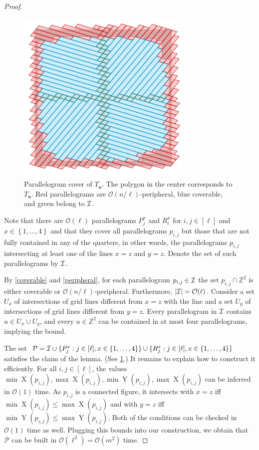 \documentclass[twoside,leqno]{article}
\newcommand{\Z}{\mathbb{Z}}
\renewcommand{\O}{\mathcal{O}}
\newcommand{\Ta}{T_\mathbf{a}}
\newcommand{\set}[1]{\left\lbrace #1 \right\rbrace}
\DeclareMathOperator*{\X}{X}
\DeclareMathOperator*{\Y}{Y}
\newcommand{\absolute}[1]{\left\lvert#1\right\rvert}
\begin{document}
\begin{proof}
\begin{figure}
        \centering
        \includegraphics[width=0.75\textwidth]{drawings/text_decomposition}
        \caption{Parallelogram cover of $\Ta$. The polygon in the center corresponds to $\Ta$. Red parallelograms are $\O(n/\ell)$-peripheral, blue coverable, and green belong to $\mathcal{I}$.}
        \label{figure:text_decomposition}
\end{figure}

Note that there are $\O(\ell)$ parallelograms $P_j^x$ and $R_i^x$ for $i,j \in [\ell]$ and $x \in \set{1, \dots, 4}$ and that they cover all parallelograms $p_{i,j}$ but those that are not fully contained in any of the quarters, in other words, the parallelograms $p_{i, j}$ intersecting  at least one of the lines $x = z$ and $y = z$. Denote the set of such parallelograms by $\mathcal{I}$. 

By \cref{coverable} and \cref{peripheral}, for each parallelogram $p_{i,j} \in \mathcal{I}$ the set $p_{i,j} \cap \Z^2$ is either coverable or $\O(n/\ell)$-peripheral. Furthermore, $\absolute{\I} = \O(\ell)$. Consider a set $U_x$ of intersections of grid lines different from $x=z$ with the line and a set $U_y$ of intersections of grid lines different from $y=z$. Every parallelogram in $\mathcal{I}$ contains $u \in U_x \cup U_y$, and every $u \in \Z^2$ can be contained in at most four parallelograms, implying the bound. 

The set $\mathcal{P} = \mathcal{I} \cup \{P_j^x : j \in [\ell], x \in \{1, \dots, 4\}\} \cup \{R_j^x : j \in [\ell], x \in \{1, \dots, 4\}\}$ satisfies the claim of the lemma. (See \cref{figure:text_decomposition}.) It remains to explain how to construct it efficiently. For all $i,j \in [\ell]$, the values $\min \X(p_{i,j}), \max \X(p_{i,j}), \min \Y(p_{i,j}), \max \X(p_{i,j})$ can be inferred in $\O(1)$ time. As $p_{i,j}$ is a connected figure, it intersects with $x = z$ iff $\min \X(p_{i,j}) \le \max \X(p_{i,j})$ and with $y = z$ iff $\min \Y(p_{i,j}) \le \max \Y(p_{i,j})$. Both of the conditions can be checked in $\O(1)$ time as well. Plugging this bounds into our construction, we obtain that $\mathcal{P}$ can be built in $\O(\ell^2) = \O(m^2)$ time. 
\end{proof}
\end{document}
